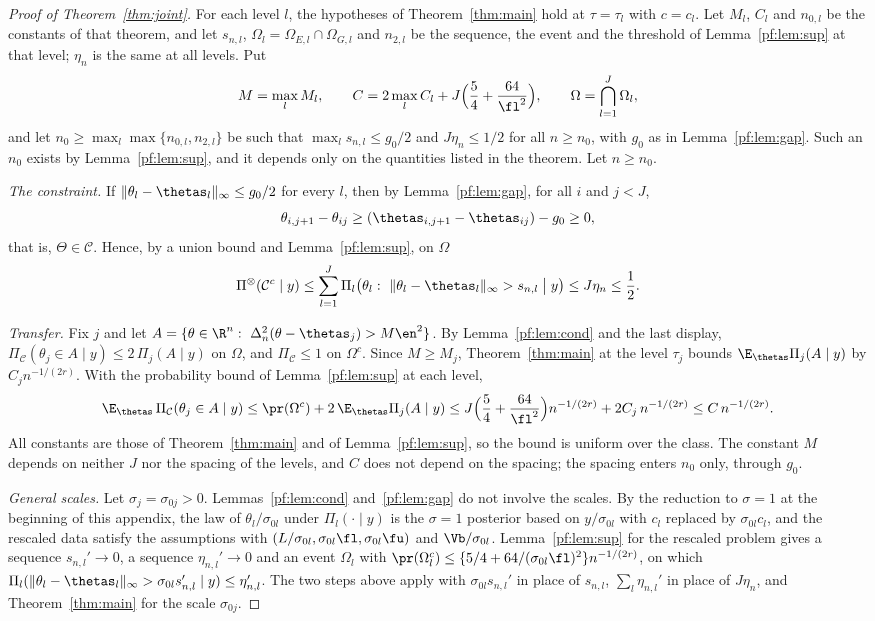 \begin{proof}[Proof of Theorem~\ref{thm:joint}]
For each level $l$, the hypotheses of Theorem~\ref{thm:main} hold at $\tau=\tau_l$ with $c=c_l$. Let $M_l$, $C_l$ and $n_{0,l}$ be the constants of that theorem, and let $s_{n,l}$, $\Omega_l=\Omega_{E,l}\cap\Omega_{G,l}$ and $n_{2,l}$ be the sequence, the event and the threshold of Lemma~\ref{pf:lem:sup} at that level; $\eta_n$ is the same at all levels. Put
\[
M=\max_{l}M_l,\qquad C=2\max_{l}C_l+J\Bigl(\frac54+\frac{64}{\fl^2}\Bigr),\qquad \Omega=\bigcap_{l=1}^J\Omega_l ,
\]
and let $n_0\ge\max_l\max\{n_{0,l},n_{2,l}\}$ be such that $\max_ls_{n,l}\le g_0/2$ and $J\eta_n\le1/2$ for all $n\ge n_0$, with $g_0$ as in Lemma~\ref{pf:lem:gap}. Such an $n_0$ exists by Lemma~\ref{pf:lem:sup}, and it depends only on the quantities listed in the theorem. Let $n\ge n_0$.

\emph{The constraint.} If $\|\theta_l-\thetas_l\|_\infty\le g_0/2$ for every $l$, then by Lemma~\ref{pf:lem:gap}, for all $i$ and $j<J$,
\[
\theta_{i,j+1}-\theta_{ij}\ge(\thetas_{i,j+1}-\thetas_{ij})-g_0\ge0 ,
\]
that is, $\Theta\in\mathcal C$. Hence, by a union bound and Lemma~\ref{pf:lem:sup}, on $\Omega$
\[
\Pi^{\otimes}(\mathcal C^c\mid y)\le\sum_{l=1}^J\Pi_l\bigl(\theta_l:\ \|\theta_l-\thetas_l\|_\infty>s_{n,l}\bigm|y\bigr)\le J\eta_n\le\frac12 .
\]

\emph{Transfer.} Fix $j$ and let $A=\{\theta\in\R^n:\ \Delta_n^2(\theta-\thetas_j)>M\en^2\}$. By Lemma~\ref{pf:lem:cond} and the last display, $\Pi_{\mathcal C}(\theta_j\in A\mid y)\le2\,\Pi_j(A\mid y)$ on $\Omega$, and $\Pi_{\mathcal C}\le1$ on $\Omega^c$. Since $M\ge M_j$, Theorem~\ref{thm:main} at the level $\tau_j$ bounds $\E_{\thetas}\Pi_j(A\mid y)$ by $C_jn^{-1/(2r)}$. With the probability bound of Lemma~\ref{pf:lem:sup} at each level,
\[
\E_{\thetas}\,\Pi_{\mathcal C}(\theta_j\in A\mid y)\le\pr(\Omega^c)+2\,\E_{\thetas}\Pi_j(A\mid y)
\le J\Bigl(\frac54+\frac{64}{\fl^2}\Bigr)n^{-1/(2r)}+2C_j\,n^{-1/(2r)}\le C\,n^{-1/(2r)} .
\]
All constants are those of Theorem~\ref{thm:main} and of Lemma~\ref{pf:lem:sup}, so the bound is uniform over the class. The constant $M$ depends on neither $J$ nor the spacing of the levels, and $C$ does not depend on the spacing; the spacing enters $n_0$ only, through $g_0$.

\emph{General scales.} Let $\sigma_j=\sigma_{0j}>0$. Lemmas~\ref{pf:lem:cond} and~\ref{pf:lem:gap} do not involve the scales. By the reduction to $\sigma=1$ at the beginning of this appendix, the law of $\theta_l/\sigma_{0l}$ under $\Pi_l(\cdot\mid y)$ is the $\sigma=1$ posterior based on $y/\sigma_{0l}$ with $c_l$ replaced by $\sigma_{0l}c_l$, and the rescaled data satisfy the assumptions with $(L/\sigma_{0l},\sigma_{0l}\fl,\sigma_{0l}\fu)$ and $\Vb/\sigma_{0l}$. Lemma~\ref{pf:lem:sup} for the rescaled problem gives a sequence $s_{n,l}'\to0$, a sequence $\eta_{n,l}'\to0$ and an event $\Omega_l$ with $\pr(\Omega_l^c)\le\{5/4+64/(\sigma_{0l}\fl)^2\}n^{-1/(2r)}$, on which $\Pi_l(\|\theta_l-\thetas_l\|_\infty>\sigma_{0l}s_{n,l}'\mid y)\le\eta_{n,l}'$. The two steps above apply with $\sigma_{0l}s_{n,l}'$ in place of $s_{n,l}$, $\sum_l\eta_{n,l}'$ in place of $J\eta_n$, and Theorem~\ref{thm:main} for the scale $\sigma_{0j}$.
\end{proof}

